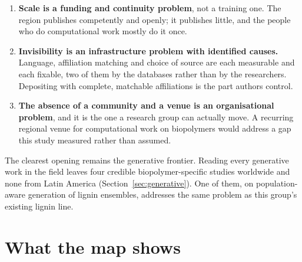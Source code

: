 \documentclass[11pt,a4paper]{article}
\begin{document}
\begin{enumerate}
\item \textbf{Scale is a funding and continuity problem}, not a training one. The region
      publishes competently and openly; it publishes little, and the people who do
      computational work mostly do it once.
\item \textbf{Invisibility is an infrastructure problem with identified causes.} Language,
      affiliation matching and choice of source are each measurable and each fixable, two of
      them by the databases rather than by the researchers. Depositing with complete,
      matchable affiliations is the part authors control.
\item \textbf{The absence of a community and a venue is an organisational problem}, and it
      is the one a research group can actually move. A recurring regional venue for
      computational work on biopolymers would address a gap this study measured rather than
      assumed.
\end{enumerate}

The clearest opening remains the generative frontier. Reading every generative work in the
field leaves four credible biopolymer-specific studies worldwide and none from Latin America
(Section~\ref{sec:generative}). One of them, on population-aware generation of lignin
ensembles, addresses the same problem as this group's existing lignin line.

\section{What the map shows}
\end{document}
